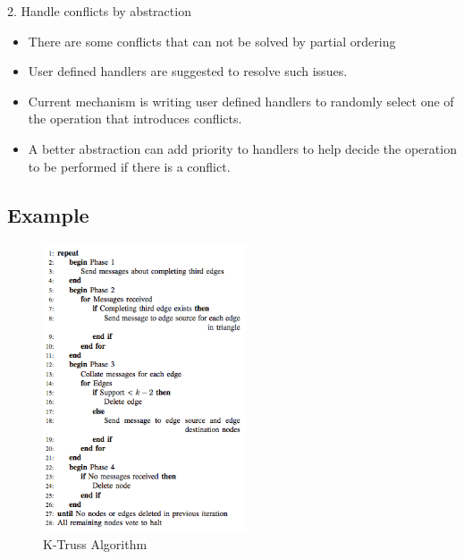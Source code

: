 \begin{frame}	

2. Handle conflicts by abstraction
		      \linebreak
		   	  \begin{itemize}
				\item There are some conflicts that can not be solved by partial ordering 
				\item User defined handlers are suggested to resolve such issues.
				\item Current mechanism is writing user defined handlers to randomly select one of the operation that introduces conflicts.
				\item A better abstraction can add priority to handlers to help decide the operation to be performed if there is a conflict.
		     	  \end{itemize}

\end{frame}


\subsection{Example}
\begin{frame}
 \begin{figure}
		\includegraphics[width=6cm, height=5 cm, angle=0]{figures/example.jpg}
		\caption{K-Truss Algorithm }
\end{figure}
		\let\thefootnote\relax{}
\end{frame}